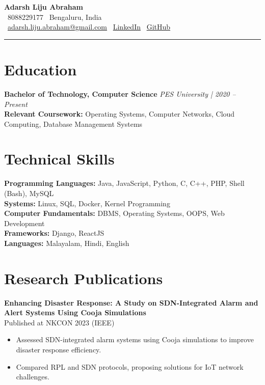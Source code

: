 \documentclass[a4paper,10pt]{article}
\begin{document}
\begin{center}
  {\Huge \textbf{Adarsh Liju Abraham}}\\[0.5em]
  \faPhone~8088229177 \quad \faMapMarker~Bengaluru, India\\[0.5em]
  \faEnvelope~\href{mailto:adarsh.liju.abraham@gmail.com}{adarsh.liju.abraham@gmail.com} \quad
  \faLinkedin~\href{https://www.linkedin.com/in/yourlinkedin}{LinkedIn} \quad
  \faGithub~\href{https://github.com/AdarshLiju}{GitHub}
\end{center}

\rule{\textwidth}{0.4mm}

\section*{Education}
\textbf{Bachelor of Technology, Computer Science} \hfill \textit{PES University | 2020 -- Present}\\
\textbf{Relevant Coursework:} Operating Systems, Computer Networks, Cloud Computing, Database Management Systems

\section*{Technical Skills}
\textbf{Programming Languages:} Java, JavaScript, Python, C, C++, PHP, Shell (Bash), MySQL\\
\textbf{Systems:} Linux, SQL, Docker, Kernel Programming\\
\textbf{Computer Fundamentals:} DBMS, Operating Systems, OOPS, Web Development\\
\textbf{Frameworks:} Django, ReactJS\\
\textbf{Languages:} Malayalam, Hindi, English

\section*{Research Publications}
\textbf{Enhancing Disaster Response: A Study on SDN-Integrated Alarm and Alert Systems Using Cooja Simulations}\\
Published at NKCON 2023 (IEEE)
\begin{itemize}
    \item Assessed SDN-integrated alarm systems using Cooja simulations to improve disaster response efficiency.
    \item Compared RPL and SDN protocols, proposing solutions for IoT network challenges.
\end{itemize}
\end{document}
